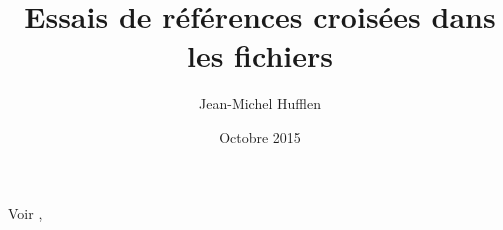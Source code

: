 \documentclass{article}
\title{Essais de références croisées dans les fichiers \filenameh{.bib}}
\author{Jean-Michel Hufflen}
\date{Octobre 2015}
\begin{document}
\maketitle

Voir \cite{lake2010},






\end{document}
